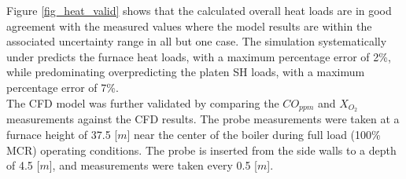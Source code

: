 \documentclass[twocolumn,10pt]{asme2ej}
\begin{document}
Figure \ref{fig_heat_valid} shows that the calculated overall heat loads are in good agreement with the measured values where the model results are within the associated uncertainty range in all but one case. The simulation systematically under predicts the furnace heat loads, with a maximum percentage error of 2\%, while predominating overpredicting the platen SH loads, with a maximum percentage error of 7\%.\\

The CFD model was further validated by comparing the $CO_{ppm}$ and $X_{O_{2}}$ measurements against the CFD results. The probe measurements were taken at a furnace height of 37.5 [$m$] near the center of the boiler during full load (100\% MCR) operating conditions. The probe is inserted from the side walls to a depth of 4.5 [$m$], and measurements were taken every 0.5 [$m$].\\
\end{document}
